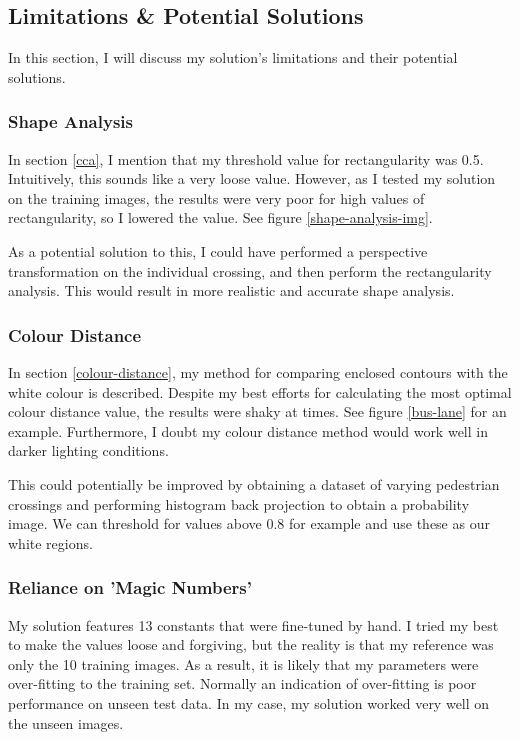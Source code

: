 \documentclass{article}  %
\begin{document}
	\subsection{Limitations \& Potential Solutions}
	
	In this section, I will discuss my solution's limitations and their potential solutions.
	
	\subsubsection{Shape Analysis}
	
	In section \ref{cca}, I mention that my threshold value for rectangularity was 0.5. Intuitively, this sounds like a very loose value. However, as I tested my solution on the training images, the results were very poor for high values of rectangularity, so I lowered the value. See figure \ref{shape-analysis-img}.
	
	As a potential solution to this, I could have performed a perspective transformation on the individual crossing, and then perform the rectangularity analysis. This would result in more realistic and accurate shape analysis.
	
	\subsubsection{Colour Distance}\label{colour-distance-limitation}
	
	In section \ref{colour-distance}, my method for comparing enclosed contours with the white colour is described. Despite my best efforts for calculating the most optimal colour distance value, the results were shaky at times. See figure \ref{bus-lane} for an example. Furthermore, I doubt my colour distance method would work well in darker lighting conditions.
	
	This could potentially be improved by obtaining a dataset of varying pedestrian crossings and performing histogram back projection to obtain a probability image. We can threshold for values above 0.8 for example and use these as our white regions.
	
	\subsubsection{Reliance on 'Magic Numbers'}
	
	My solution features 13 constants that were fine-tuned by hand. I tried my best to make the values loose and forgiving, but the reality is that my reference was only the 10 training images. As a result, it is likely that my parameters were over-fitting to the training set. Normally an indication of over-fitting is poor performance on unseen test data. In my case, my solution worked very well on the unseen images. 
	
\end{document}
